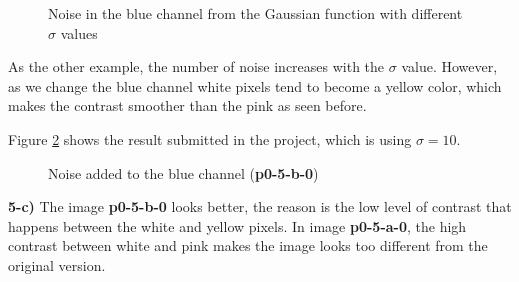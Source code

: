 \documentclass[12pt,a4paper]{article}
\begin{document}
\begin{figure}[!h]
	\quad
	\caption{Noise in the blue channel  from the Gaussian function with different $\sigma$ values}%
	\label{fig:blue-sigma}%
\end{figure}

As the other example, the number of noise increases with the $\sigma$ value. However, as we change the blue channel white pixels tend to become a yellow color, which makes the contrast smoother than the pink as seen before.

Figure \ref{fig:p0-5-b-0} shows the result submitted in the project, which is using $\sigma = 10$.

\begin{figure}[!h]
	\centering
	{%
		\setlength{\fboxsep}{1pt}%
		\setlength{\fboxrule}{1pt}%
	}%
	\caption{Noise added to the blue channel (\textbf{p0-5-b-0})}
	\label{fig:p0-5-b-0}
\end{figure}


\textbf{5-c) } The image \textbf{p0-5-b-0} looks better, the reason is the low level of contrast that happens between the white and yellow pixels. In image \textbf{p0-5-a-0}, the high contrast between white and pink makes the image looks too different from the original version.
\end{document}
